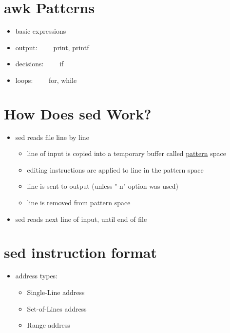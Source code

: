 \documentclass{report}
\begin{document}
\section{awk Patterns}
\begin{itemize}
  \item basic expressions
    \bigbreak \noindent
  \item output: \ \ \ \ print, printf
  \item decisions: \ \ \ \ if
  \item loops: \ \ \ \ for, while
\end{itemize}
\section{How Does sed Work?}
\begin{itemize}
  \item sed reads file line by line
    \begin{itemize}[label=$\circ$]
      \item line of input is copied into a temporary buffer called \underline{pattern} space
      \item editing instructions are applied to line in the pattern space
      \item line is sent to output (unless "-n" option was used)
      \item line is removed from pattern space
    \end{itemize}
  \item sed reads next line of input, until end of file
\end{itemize}
\section{sed instruction format}
\begin{itemize}
  \text address determines which lines in the input file are to be processed by the commands(s)
  \begin{itemize}[label=$\circ$]
    \item if no address is given, then the command is applied to each input line
  \end{itemize}
\item address types:
  \begin{itemize}[label=$\circ$]
    \item Single-Line address
    \item Set-of-Lines address
    \item Range address
  \end{itemize}
\end{itemize}
\end{document}
